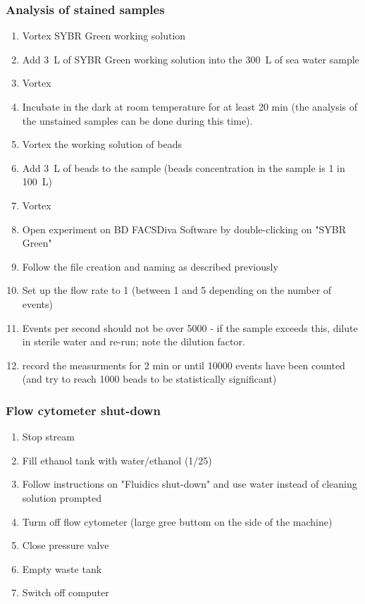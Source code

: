 \subsubsection{Analysis of stained samples}

\begin{enumerate}
\item Vortex SYBR Green working solution
\item Add 3~\textmu L of SYBR Green working solution into the 300~\textmu L of sea water sample
\item Vortex
\item Incubate in the dark at room temperature for at least 20 min (the analysis of the unstained samples can be done during this time).
\item Vortex the working solution of beads
\item Add 3~\textmu L of beads to the sample (beads concentration in the sample is 1 in 100~\textmu L)
\item Vortex 
\item Open experiment on BD FACSDiva Software by double-clicking on "SYBR Green"
\item Follow the file creation and naming as described previously
\item Set up the flow rate to 1 (between 1 and 5 depending on the number of events)
\item Events per second should not be over 5000 - if the sample exceeds this, dilute in sterile water and re-run; note the dilution factor.
\item record the measurments for 2 min or until 10000 events have been counted (and try to reach 1000 beads to be statistically significant)
\end{enumerate}

\subsubsection{Flow cytometer shut-down}

\begin{enumerate}
\item Stop stream
\item Fill ethanol tank with water/ethanol (1/25)
\item Follow instructions on "Fluidics shut-down" and use water instead of cleaning solution prompted
\item Turm off flow cytometer (large gree buttom on the side of the machine)
\item Close pressure valve
\item Empty waste tank
\item Switch off computer
\end{enumerate}